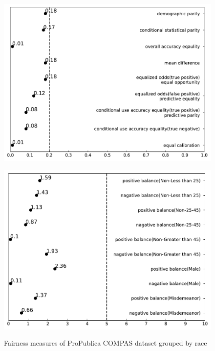 \documentclass[conference]{IEEEtran}
\begin{document}
\begin{figure}[h]
\begin{minipage}[b]{0.48\linewidth}
        \includegraphics[width=\linewidth]{Non-Hispanic}
        \label{fig:2}
    \end{minipage}
    \hfill
    \begin{minipage}[b]{0.48\linewidth}
        \centering
        \includegraphics[width=\linewidth]{race balance}
        \label{fig:2}
    \end{minipage}
    \caption{Fairness measures of ProPublica COMPAS dataset grouped by race}
    \label{fig:compas}
\end{figure}
\end{document}
